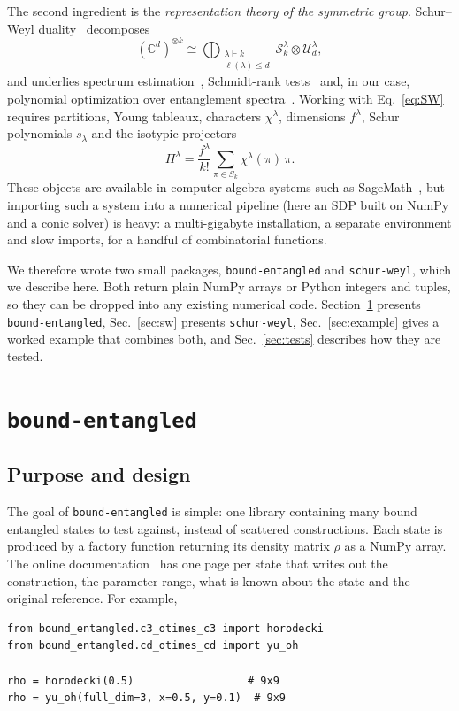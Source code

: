 \documentclass[aps,pra,twocolumn,superscriptaddress,groupedaddress]{revtex4-2}
\newcommand{\C}{\mathds{C}}
\newcommand{\code}[1]{\texttt{#1}}
\begin{document}
The second ingredient is the \emph{representation theory of the symmetric
group}. Schur--Weyl duality~\cite{Fulton1991} decomposes
\begin{equation}\label{eq:SW}
  (\C^d)^{\otimes k} \cong \bigoplus_{\substack{\lambda\vdash k\\ \ell(\lambda)\le d}}
  \mathcal{S}^\lambda_k \otimes \mathcal{U}^\lambda_d,
\end{equation}
and underlies spectrum estimation~\cite{Keyl2001}, Schmidt-rank
tests~\cite{Christandl2005} and, in our case, polynomial optimization over
entanglement spectra~\cite{mainpaper}. Working with Eq.~\eqref{eq:SW} requires
partitions, Young tableaux, characters $\chi^\lambda$, dimensions $f^\lambda$,
Schur polynomials $s_\lambda$ and the isotypic projectors
\begin{equation}\label{eq:isotypic}
  \Pi^\lambda = \frac{f^\lambda}{k!}\sum_{\pi\in S_k}\chi^\lambda(\pi)\,\pi .
\end{equation}
These objects are available in computer algebra systems such as
SageMath~\cite{sagemath}, but importing such a system into a numerical
pipeline (here an SDP built on NumPy and a conic solver) is heavy: a
multi-gigabyte installation, a separate environment and slow imports, for a
handful of combinatorial functions.

We therefore wrote two small packages, \code{bound-entangled} and
\code{schur-weyl}, which we describe here. Both return plain NumPy arrays or
Python integers and tuples, so they can be dropped into any existing numerical
code. Section~\ref{sec:be} presents \code{bound-entangled},
Sec.~\ref{sec:sw} presents \code{schur-weyl}, Sec.~\ref{sec:example} gives a
worked example that combines both, and Sec.~\ref{sec:tests} describes how they
are tested.

\section{\code{bound-entangled}}\label{sec:be}

\subsection{Purpose and design}

The goal of \code{bound-entangled} is simple: one library containing many
bound entangled states to test against, instead of scattered constructions.
Each state is produced by a factory function returning its density matrix
$\rho$ as a NumPy array. The online documentation~\cite{be-docs} has one page
per state that writes out the construction, the parameter range, what is known
about the state and the original reference. For example,
\begin{lstlisting}
from bound_entangled.c3_otimes_c3 import horodecki
from bound_entangled.cd_otimes_cd import yu_oh

rho = horodecki(0.5)                  # 9x9
rho = yu_oh(full_dim=3, x=0.5, y=0.1)  # 9x9
\end{lstlisting}
\end{document}

